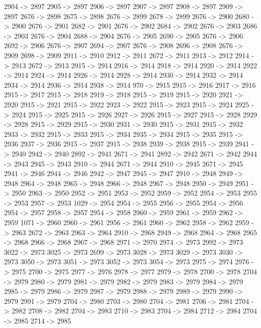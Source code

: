 {	2904 -> 2897
	2905 -> 2897
	2906 -> 2897
	2907 -> 2897
	2908 -> 2897
	2909 -> 2897
	2676 -> 2898
	2675 -> 2898
	2676 -> 2899
	2678 -> 2899
	2676 -> 2900
	2680 -> 2900
	2676 -> 2901
	2682 -> 2901
	2676 -> 2902
	2684 -> 2902
	2676 -> 2903
	2686 -> 2903
	2676 -> 2904
	2688 -> 2904
	2676 -> 2905
	2690 -> 2905
	2676 -> 2906
	2692 -> 2906
	2676 -> 2907
	2694 -> 2907
	2676 -> 2908
	2696 -> 2908
	2676 -> 2909
	2698 -> 2909
	2911 -> 2910
	2912 -> 2911
	2672 -> 2911
	2913 -> 2912
	2914 -> 2913
	2672 -> 2913
	2915 -> 2914
	2916 -> 2914
	2918 -> 2914
	2920 -> 2914
	2922 -> 2914
	2924 -> 2914
	2926 -> 2914
	2928 -> 2914
	2930 -> 2914
	2932 -> 2914
	2934 -> 2914
	2936 -> 2914
	2938 -> 2914
	970 -> 2915
	2915 -> 2916
	2917 -> 2916
	2915 -> 2917
	2915 -> 2918
	2919 -> 2918
	2915 -> 2919
	2915 -> 2920
	2921 -> 2920
	2915 -> 2921
	2915 -> 2922
	2923 -> 2922
	2915 -> 2923
	2915 -> 2924
	2925 -> 2924
	2915 -> 2925
	2915 -> 2926
	2927 -> 2926
	2915 -> 2927
	2915 -> 2928
	2929 -> 2928
	2915 -> 2929
	2915 -> 2930
	2931 -> 2930
	2915 -> 2931
	2915 -> 2932
	2933 -> 2932
	2915 -> 2933
	2915 -> 2934
	2935 -> 2934
	2915 -> 2935
	2915 -> 2936
	2937 -> 2936
	2915 -> 2937
	2915 -> 2938
	2939 -> 2938
	2915 -> 2939
	2941 -> 2940
	2942 -> 2940
	2892 -> 2941
	2671 -> 2941
	2892 -> 2942
	2671 -> 2942
	2944 -> 2943
	2945 -> 2943
	2910 -> 2944
	2671 -> 2944
	2910 -> 2945
	2671 -> 2945
	2941 -> 2946
	2944 -> 2946
	2942 -> 2947
	2945 -> 2947
	2910 -> 2948
	2949 -> 2948
	2964 -> 2948
	2965 -> 2948
	2966 -> 2948
	2967 -> 2948
	2950 -> 2949
	2951 -> 2950
	2963 -> 2950
	2952 -> 2951
	2953 -> 2952
	2959 -> 2952
	2954 -> 2953
	2955 -> 2953
	2957 -> 2953
	1029 -> 2954
	2954 -> 2955
	2956 -> 2955
	2954 -> 2956
	2954 -> 2957
	2958 -> 2957
	2954 -> 2958
	2960 -> 2959
	2961 -> 2959
	2962 -> 2959
	1071 -> 2960
	2960 -> 2961
	2956 -> 2961
	2960 -> 2962
	2958 -> 2962
	2959 -> 2963
	2672 -> 2963
	2963 -> 2964
	2910 -> 2968
	2949 -> 2968
	2964 -> 2968
	2965 -> 2968
	2966 -> 2968
	2967 -> 2968
	2971 -> 2970
	2974 -> 2973
	2992 -> 2973
	3022 -> 2973
	3025 -> 2973
	2699 -> 2973
	3028 -> 2973
	3029 -> 2973
	3030 -> 2973
	3050 -> 2973
	3051 -> 2973
	3052 -> 2973
	3054 -> 2973
	2975 -> 2974
	2976 -> 2975
	2700 -> 2975
	2977 -> 2976
	2978 -> 2977
	2979 -> 2978
	2700 -> 2978
	2704 -> 2979
	2980 -> 2979
	2981 -> 2979
	2982 -> 2979
	2983 -> 2979
	2984 -> 2979
	2985 -> 2979
	2986 -> 2979
	2987 -> 2979
	2988 -> 2979
	2989 -> 2979
	2990 -> 2979
	2991 -> 2979
	2704 -> 2980
	2703 -> 2980
	2704 -> 2981
	2706 -> 2981
	2704 -> 2982
	2708 -> 2982
	2704 -> 2983
	2710 -> 2983
	2704 -> 2984
	2712 -> 2984
	2704 -> 2985
	2714 -> 2985
}
